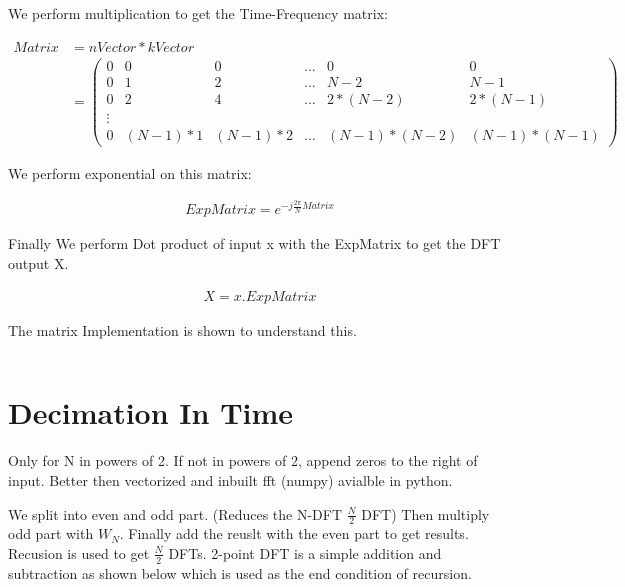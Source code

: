 \documentclass{article}
\begin{document}
We perform multiplication to  get the Time-Frequency matrix:


\begin{align*}
    Matrix & = nVector * kVector         \\
           & = \begin{pmatrix}
        0 & 0       & 0       & \dots & 0           & 0           \\
        0 & 1       & 2       & \dots & N-2         & N-1         \\
        0 & 2       & 4       & \dots & 2*(N-2)     & 2*(N-1)     \\
        \vdots                                                    \\
        0 & (N-1)*1 & (N-1)*2 & \dots & (N-1)*(N-2) & (N-1)*(N-1)
    \end{pmatrix}
\end{align*}

We perform exponential on this matrix:

\begin{align*}
    ExpMatrix = e^{-j \frac{2\pi}{N} Matrix}
\end{align*}

Finally We perform Dot product of input x with the ExpMatrix to get the DFT output X.

\begin{align*}
    X = x . ExpMatrix
\end{align*}

The matrix Implementation is shown to understand this.
\inputminted[frame=lines, linenos]{matlab}{DFTUsingVectorDotProduct.m }


\section{Decimation In Time}
Only for N in powers of 2. If not in powers of 2, append zeros to the right of input.
Better then vectorized and inbuilt fft (numpy) avialble in python.

We split into even and odd part. (Reduces the N-DFT $\frac{N}{2}$ DFT)
Then multiply odd part with $W_N$.
Finally add the reuslt with the even part to get results.
Recusion is used to get $\frac{N}{2}$ DFTs.
2-point DFT is a simple addition and subtraction as shown below which is used as the end condition of recursion.
\end{document}
